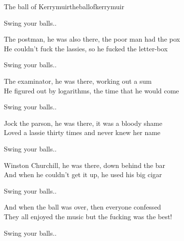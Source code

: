 \begin{song}{The ball of Kerrymuir}{theballofkerrymuir}
\begin{vers}
\end{vers}
\begin{vers}
Swing your balls..\\
\end{vers}
\begin{vers}
The postman, he was also there, the poor man had the pox\\
He couldn't fuck the lassies, so he fucked the letter-box\\
\end{vers}
\begin{vers}
Swing your balls..\\
\end{vers}
\begin{vers}
The examinator, he was there, working out a sum\\
He figured out by logarithms, the time that he would come\\
\end{vers}
\begin{vers}
Swing your balls..\\
\end{vers}
\begin{vers}
Jock the parson, he was there, it was a bloody shame\\
Loved a lassie thirty times and never knew her name\\
\end{vers}
\begin{vers}
Swing your balls..\\
\end{vers}
\begin{vers}
Winston Churchill, he was there, down behind the bar\\
And when he couldn't get it up, he used his big cigar\\
\end{vers}
\begin{vers}
Swing your balls..\\
\end{vers}
\begin{vers}
And when the ball was over, then everyone confessed\\
They all enjoyed the music but the fucking was the best!\\
\end{vers}
\begin{vers}
Swing your balls..\\
\end{vers}
\end{song}

